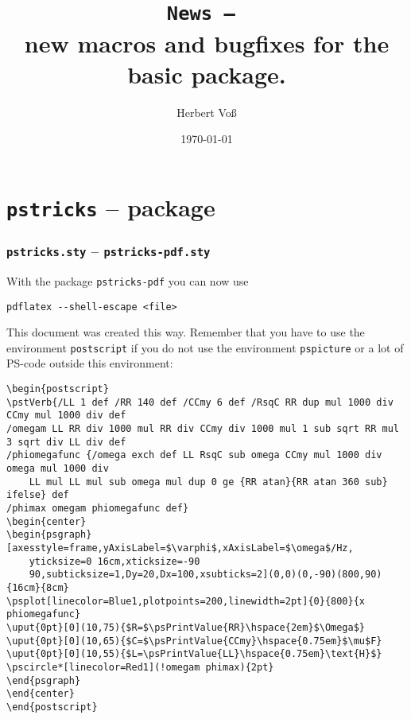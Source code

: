 \documentclass[11pt,english,BCOR=10mm,DIV=12,bibliography=totoc,parskip=false,headings=small,
    headinclude=false,footinclude=false,twoside]{scrartcl}
\begin{document}
\title{\texttt{News -- \the\year}\\ \Large new macros and bugfixes for the basic package.}
\author{Herbert Voß}
\date{\today}

\maketitle

\tableofcontents

\part{\texttt{pstricks} -- package}

\section{\texttt{pstricks.sty} -- \texttt{pstricks-pdf.sty}}

With the package \texttt{pstricks-pdf} you can now use 

\begin{verbatim}
pdflatex --shell-escape <file>
\end{verbatim}

This document was created this way. Remember that you have to use the environment \texttt{postscript}
if you do not use the environment \texttt{pspicture} or a lot of PS-code outside this environment:

\begin{lstlisting}
\begin{postscript}
\pstVerb{/LL 1 def /RR 140 def /CCmy 6 def /RsqC RR dup mul 1000 div CCmy mul 1000 div def 
/omegam LL RR div 1000 mul RR div CCmy div 1000 mul 1 sub sqrt RR mul 3 sqrt div LL div def 
/phiomegafunc {/omega exch def LL RsqC sub omega CCmy mul 1000 div omega mul 1000 div 
    LL mul LL mul sub omega mul dup 0 ge {RR atan}{RR atan 360 sub} ifelse} def 
/phimax omegam phiomegafunc def}
\begin{center}
\begin{psgraph}[axesstyle=frame,yAxisLabel=$\varphi$,xAxisLabel=$\omega$/Hz,
	yticksize=0 16cm,xticksize=-90 
	90,subticksize=1,Dy=20,Dx=100,xsubticks=2](0,0)(0,-90)(800,90){16cm}{8cm}
\psplot[linecolor=Blue1,plotpoints=200,linewidth=2pt]{0}{800}{x phiomegafunc}
\uput{0pt}[0](10,75){$R=$\psPrintValue{RR}\hspace{2em}$\Omega$}
\uput{0pt}[0](10,65){$C=$\psPrintValue{CCmy}\hspace{0.75em}$\mu$F}
\uput{0pt}[0](10,55){$L=\psPrintValue{LL}\hspace{0.75em}\text{H}$}
\pscircle*[linecolor=Red1](!omegam phimax){2pt}
\end{psgraph}
\end{center}
\end{postscript}
\end{lstlisting}
\end{document}
